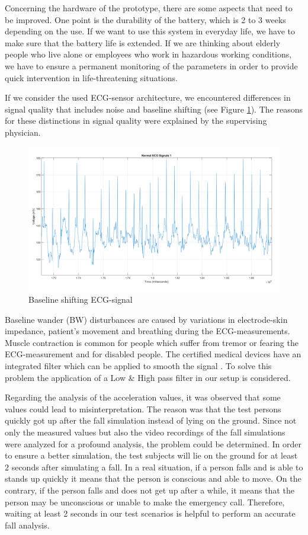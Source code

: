 \documentclass[review]{elsarticle}
\begin{document}
Concerning the hardware of the prototype, there are some aspects that need to be improved. One point is the durability of the battery, which is 2 to 3 weeks depending on the use. If we want to use this system in everyday life, we have to make sure that the battery life is extended. If we are thinking about elderly people who live alone or employees who work in hazardous working conditions, we have to ensure a permanent monitoring of the parameters in order to provide quick intervention in life-threatening situations.

If we consider the used ECG-sensor architecture, we encountered differences in signal quality that includes noise and baseline shifting (see Figure \ref{fig:ECGBaselineShifting}). The reasons for these distinctions in signal quality were explained by the supervising physician. 
\begin{figure}[!ht]
	\centering
	\includegraphics[scale=0.27]{Images/NormalECG1.png}
	\caption[Measured ECG-signal]{Baseline shifting ECG-signal}
	\label{fig:ECGBaselineShifting}
\end{figure}
Baseline wander (BW) disturbances are caused by variations in electrode-skin impedance, patient's movement and breathing during the ECG-measurements. Muscle contraction is common for people which suffer from tremor or fearing the ECG-measurement and for disabled people. The certified medical devices have an integrated filter which can be applied to smooth the signal \cite{ECGNoise,DrNicoletteWagner}. To solve this problem the application of a Low \& High pass filter in our setup is considered.

Regarding the analysis of the acceleration values, it was observed that some values could lead to misinterpretation. The reason was that the test persons quickly got up after the fall simulation instead of lying on the ground.
Since not only the measured values but also the video recordings of the fall simulations were analyzed for a profound analysis, the problem could be determined. In order to ensure a better simulation, the test subjects will lie on the ground for at least 2 seconds after simulating a fall. In a real situation, if a person falls and is able to stands up quickly it means that the person is conscious and able to move. On the contrary, if the person falls and does not get up after a while, it means that the person may be unconscious or unable to make the emergency call.  Therefore, waiting at least 2 seconds in our test scenarios is helpful to perform an accurate fall analysis.
\end{document}
